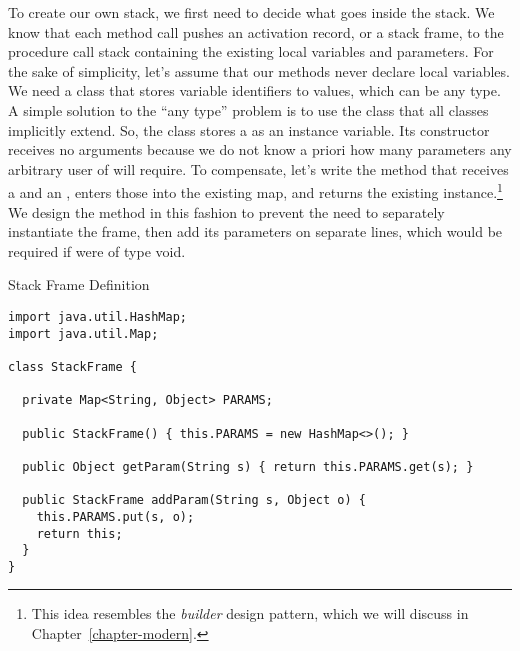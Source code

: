 
To create our own stack, we first need to decide what goes inside the stack. We know that each method call pushes an activation record, or a stack frame, to the procedure call stack containing the existing local variables and parameters. For the sake of simplicity, let's assume that our methods never declare local variables. We need a class that stores variable identifiers to values, which can be any type. A simple solution to the ``any type'' problem is to use the  class that all classes implicitly extend. So, the  class stores a  as an instance variable. Its constructor receives no arguments because we do not know a priori how many parameters any arbitrary user of  will require. To compensate, let's write the  method that receives a  and an , enters those into the existing map, and returns the existing instance.\footnote{This idea resembles the \emph{builder} design pattern, which we will discuss in Chapter~\ref{chapter-modern}.} We design the method in this fashion to prevent the need to separately instantiate the frame, then add its parameters on separate lines, which would be required if  were of type void.

\begin{cl}{Stack Frame Definition}
\begin{lstlisting}[language=MyJava]
import java.util.HashMap;
import java.util.Map;

class StackFrame {

  private Map<String, Object> PARAMS;

  public StackFrame() { this.PARAMS = new HashMap<>(); }

  public Object getParam(String s) { return this.PARAMS.get(s); }

  public StackFrame addParam(String s, Object o) {
    this.PARAMS.put(s, o);
    return this;
  }
}
\end{lstlisting}
\end{cl}

